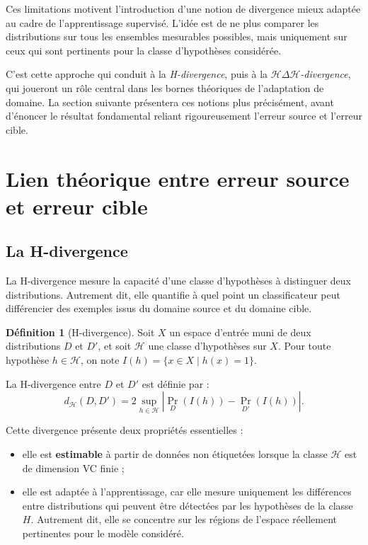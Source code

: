 \documentclass[a4paper,12pt]{article}
\theoremstyle{definition}
\newtheorem{definition}{Définition}[section]
\theoremstyle{remark}
\begin{document}
Ces limitations motivent l’introduction d’une notion de divergence mieux adaptée au cadre de l’apprentissage supervisé. L’idée est de ne plus comparer les distributions sur tous les ensembles mesurables possibles, mais uniquement sur ceux qui sont pertinents pour la classe d’hypothèses considérée.

C’est cette approche qui conduit à la \emph{H-divergence}, puis à la \emph{$\mathcal{H}\Delta\mathcal{H}$-divergence}, qui joueront un rôle central dans les bornes théoriques de l’adaptation de domaine. La section suivante présentera ces notions plus précisément, avant d’énoncer le résultat fondamental reliant rigoureusement l’erreur source et l’erreur cible.\\


\section{Lien théorique entre erreur source et erreur cible}

\subsection{La H-divergence}

La H-divergence mesure la capacité d’une classe d’hypothèses à distinguer deux distributions. Autrement dit, elle quantifie à quel point un classificateur peut différencier des exemples issus du domaine source et du domaine cible.

\begin{definition}[H-divergence]
Soit $X$ un espace d’entrée muni de deux distributions $D$ et $D'$, et soit $\mathcal{H}$ une classe d’hypothèses sur $X$. Pour toute hypothèse $h \in \mathcal{H}$, on note $I(h) = \{x \in X \mid h(x) = 1\}$.

La H-divergence entre $D$ et $D'$ est définie par :
\[
d_{\mathcal{H}}(D, D') = 2 \sup_{h \in \mathcal{H}} \left| \Pr_D(I(h)) - \Pr_{D'}(I(h)) \right|.
\]
\end{definition}


Cette divergence présente deux propriétés essentielles :
\begin{itemize}
\item elle est \textbf{estimable} à partir de données non étiquetées lorsque la classe $\mathcal{H}$ est de dimension VC finie ;
\item elle est adaptée à l’apprentissage, car elle mesure uniquement les différences entre distributions qui peuvent être détectées par les hypothèses de la classe $H$. Autrement dit, elle se concentre sur les régions de l’espace réellement pertinentes pour le modèle considéré.\\
\end{itemize}
\end{document}
